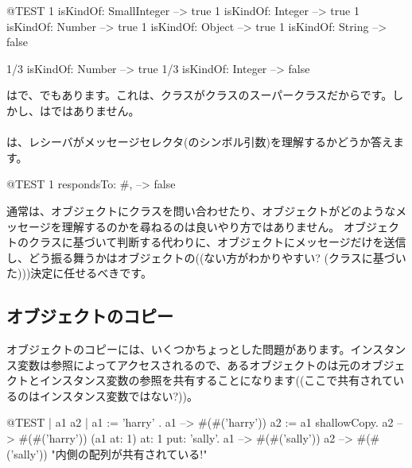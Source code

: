 \documentclass[a4paper,10pt,twoside]{book}
\begin{document}
\begin{code}{@TEST}
1 isKindOf: SmallInteger --> true
1 isKindOf: Integer          --> true
1 isKindOf: Number         --> true
1 isKindOf: Object           --> true
1 isKindOf: String            --> false

1/3 isKindOf: Number      --> true
1/3 isKindOf: Integer        --> false
\end{code}

はで、でもあります。これは、クラスがクラスのスーパークラスだからです。しかし、はではありません。

\paragraph{}
は、レシーバがメッセージセレクタ(のシンボル引数)を理解するかどうか答えます。

\begin{code}{@TEST}
1 respondsTo: #, --> false
\end{code}

通常は、オブジェクトにクラスを問い合わせたり、オブジェクトがどのようなメッセージを理解するのかを尋ねるのは良いやり方ではありません。
オブジェクトのクラスに基づいて判断する代わりに、オブジェクトにメッセージだけを送信し、どう振る舞うかはオブジェクトの((ない方がわかりやすい? (\ie クラスに基づいた)))決定に任せるべきです。

\subsection{オブジェクトのコピー}

オブジェクトのコピーには、いくつかちょっとした問題があります。インスタンス変数は参照によってアクセスされるので、あるオブジェクトのは元のオブジェクトとインスタンス変数の参照を共有することになります((ここで共有されているのはインスタンス変数ではない?))。

\begin{code}{@TEST | a1 a2 |}
a1 := { { 'harry' } }.
a1 --> #(#('harry'))
a2 := a1 shallowCopy.
a2 --> #(#('harry'))
(a1 at: 1) at: 1 put: 'sally'.
a1 --> #(#('sally'))
a2 --> #(#('sally'))    "内側の配列が共有されている!"
\end{code}
\end{document}
